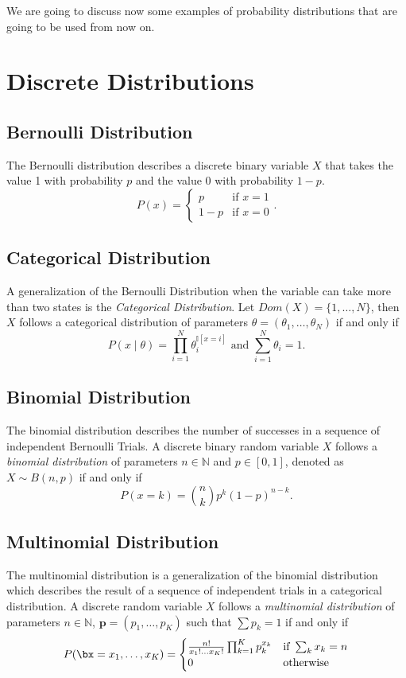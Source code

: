 We are going to discuss now some examples of probability distributions that are
going to be used from now on.

\section{Discrete Distributions}

\subsection{Bernoulli Distribution}

The Bernoulli distribution describes a discrete binary variable \(X\) that takes
the value 1 with probability \(p\) and the value 0 with probability \(1-p\).
\[
  P(x) =
\left\{
  \begin{array}{ll}
    p  & \mbox{if } x = 1 \\
    1-p & \mbox{if } x = 0
  \end{array}.
\right.
\]

\subsection{Categorical Distribution}

A generalization of the Bernoulli Distribution when the variable can take more than two states is the \emph{Categorical Distribution}. Let \(Dom(X) = \{1,\dots,N\}\), then \(X\) follows a categorical distribution of parameters \(\theta = (\theta_{1},\dots, \theta_{N})\) if and only if
\[
  P(x \mid \theta) = \prod_{i=1}^{N}\theta_{i}^{\mathbb{I}[x = i]} \text{ and } \sum_{i = 1}^{N}\theta_{i} = 1.
\]

\subsection{Binomial Distribution}

The binomial distribution describes the number of successes in a sequence of
independent Bernoulli Trials. A discrete binary random variable \(X\) follows a
\emph{binomial distribution} of parameters \(n \in \mathbb{N}\) and \(p \in
[0,1]\), denoted as \(X \sim B(n, p)\) if and only if
\[
  P(x = k) = \binom{n}{k}p^k(1-p)^{n-k}.
\]


\subsection{Multinomial Distribution}
The multinomial distribution is a generalization of the binomial distribution which describes the result of a sequence of independent trials in a categorical distribution. A discrete random variable \(X\) follows a \emph{multinomial distribution} of parameters \(n \in \mathbb{N}\), \(\bm{p} = (p_{1},\dots,p_{K})\) such that \(\sum p_{k} = 1\)  if and only if
\[
  P(\bx =x_{1},\dots,x_{K}) =
  \begin{cases}
    \frac{n!}{x_{1}!\dots x_{K}!}\prod_{k=1}^{K}p_{k}^{x_{k}} & \text{if } \sum_{k}{x_{k}} = n\\
    0 & \text{otherwise}
  \end{cases}
\]

